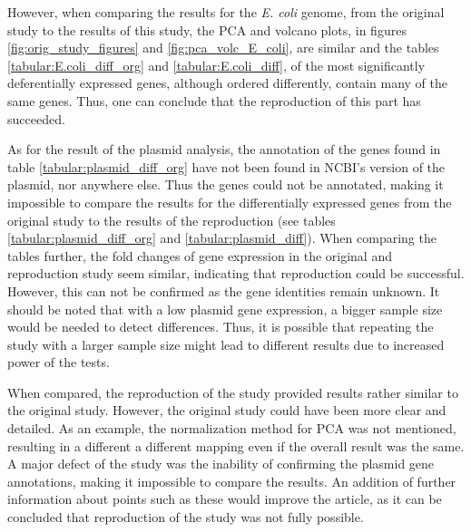 However, when comparing the results for the \textit{E. coli} genome, from the original study to the results of this study, the PCA and volcano plots, in figures \ref{fig:orig_study_figures} and \ref{fig:pca_volc_E_coli}, are similar and the tables \ref{tabular:E.coli_diff_org} and \ref{tabular:E.coli_diff}, of the most significantly deferentially expressed genes, although ordered differently, contain many of the same genes. Thus, one can conclude that the reproduction of this part has succeeded. 





As for the result of the plasmid analysis, the annotation of the genes found in table \ref{tabular:plasmid_diff_org} have not been found in NCBI's version of the plasmid, nor anywhere else. Thus the genes could not be annotated, making it impossible to compare the results for the differentially expressed genes from the original study to the results of the reproduction (see tables \ref{tabular:plasmid_diff_org} and \ref{tabular:plasmid_diff}). When comparing the tables further, the fold changes of gene expression in the original and reproduction study seem similar, indicating that reproduction could be successful. However, this can not be confirmed as the gene identities remain unknown. It should be noted that with a low plasmid gene expression, a bigger sample size would be needed to detect differences. Thus, it is possible that repeating the study with a larger sample size might lead to different results due to increased power of the tests. 


When compared, the reproduction of the study provided results rather similar to the original study. However, the original study could have been more clear and detailed. As an example, the normalization method for PCA was not mentioned, resulting in a different a different mapping even if the overall result was the same. A major defect of the study was the inability of confirming the plasmid gene annotations, making it impossible to compare the results. An addition of further information about points such as these would improve the article, as it can be concluded that reproduction of the study was not fully possible.



